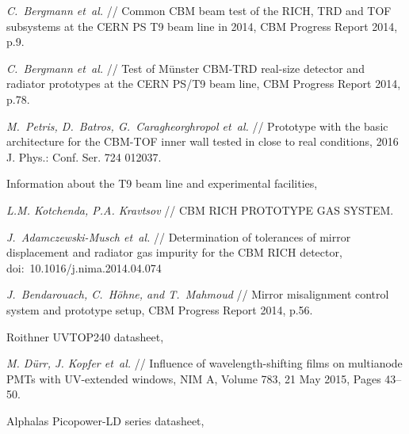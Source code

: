 \begin{thebibliography}{99}

\textit{C.~Bergmann et~al.} //
Common CBM beam test of the RICH, TRD and TOF subsystems at the CERN PS T9 beam line in 2014,
CBM Progress Report 2014, p.9.

\textit{C.~Bergmann et~al.} //
Test of M\"unster CBM-TRD real-size detector and radiator prototypes at the CERN PS/T9 beam line,
CBM Progress Report 2014, p.78.

\textit{M.~Petris, D.~Batros, G.~Caragheorghropol et~al.} //
Prototype with the basic architecture for the CBM-TOF inner wall tested in close to real conditions,
2016 J. Phys.: Conf. Ser. 724 012037.

Information about the T9 beam line and experimental facilities,

\textit{L.M. Kotchenda, P.A. Kravtsov} //
CBM RICH PROTOTYPE GAS SYSTEM.

\textit{J.~Adamczewski-Musch et~al.} //
Determination of tolerances of mirror displacement and radiator gas impurity for the CBM RICH detector,
doi:~10.1016/j.nima.2014.04.074

\textit{J.~Bendarouach, C.~H\"{o}hne, and T.~Mahmoud} //
Mirror misalignment control system and prototype setup,
CBM Progress Report 2014, p.56.

Roithner UVTOP240 datasheet,

\textit{M. D\"{u}rr, J. Kopfer et~al.} //
Influence of wavelength-shifting films on multianode PMTs with UV-extended windows,
NIM A, Volume 783, 21 May 2015, Pages 43–50.

Alphalas Picopower-LD series datasheet,



\end{thebibliography}
